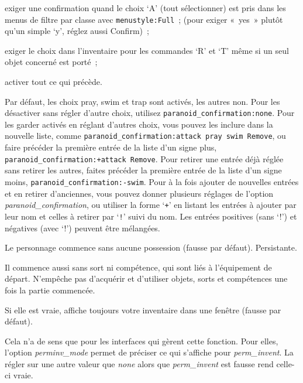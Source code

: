 \documentclass[titlepage]{article}
\begin{document}
\begin{description}
\begin{description}
exiger une confirmation quand le choix `A' (tout sélectionner) est pris
dans les menus de filtre par classe avec \texttt{menustyle:Full}~; (pour
exiger «~yes~» plutôt qu'un simple `y', réglez aussi
Confirm)~;
\item[{Remove}]
exiger le choix dans l'inventaire pour les commandes `R' et `T'
même si un seul objet concerné est porté~;
\item[{all}]
activer tout ce qui précède.
\end{description}
Par défaut, les choix pray, swim et trap sont activés, les autres non.
Pour les désactiver sans régler d'autre choix, utilisez
\texttt{paranoid\_confirmation:none}.
Pour les garder activés en réglant d'autres choix, vous pouvez les inclure
dans la nouvelle liste, comme
\texttt{paranoid\_confirmation:attack pray swim Remove},
ou faire précéder la première entrée de la liste d'un signe plus,
\texttt{paranoid\_confirmation:+attack Remove}.
Pour retirer une entrée déjà réglée sans retirer les autres, faites
précéder la première entrée de la liste d'un signe moins,
\texttt{paranoid\_confirmation:-swim}.
Pour à la fois ajouter de nouvelles entrées et en retirer d'anciennes, vous
pouvez donner plusieurs réglages de l'option \textit{paranoid\_confirmation},
ou utiliser la forme `\texttt{+}' en listant les entrées à ajouter par
leur nom et celles à retirer par `\texttt{!}' suivi du nom.
Les entrées positives (sans `!') et négatives (avec `!') peuvent
être mélangées.

\item[{pauper}]
Le personnage commence sans aucune possession (fausse par défaut).
Persistante.


Il commence aussi sans sort ni compétence, qui sont liés à l'équipement de
départ.
N'empêche pas d'acquérir et d'utiliser objets, sorts et compétences une
fois la partie commencée.

\item[{perm\_invent}]
Si elle est vraie, affiche toujours votre inventaire dans une fenêtre
(fausse par défaut).


Cela n'a de sens que pour les interfaces qui gèrent cette fonction.
Pour elles, l'option
\textit{perminv\_mode}
permet de préciser ce qui s'affiche pour \textit{perm\_invent}.
La régler sur une autre valeur que \textit{none} alors que \textit{perm\_invent} est
fausse rend celle-ci vraie.


\end{description}
\end{document}
